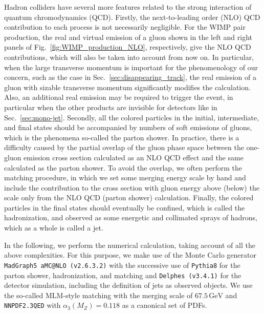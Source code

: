\documentclass[12pt,twoside,book]{article}
\begin{document}
Hadron colliders have several more features related to the strong interaction of quantum chromodynamics (QCD).
Firstly, the next-to-leading order (NLO) QCD contribution to each process is not necessarily negligible.
For the WIMP pair production, the real and virtual emission of a gluon shown in the left and right panels of Fig.~\ref{fig:WIMP_production_NLO}, respectively, give the NLO QCD contributions, which will also be taken into account from now on.
In particular, when the large transverse momentum is important for the phenomenology of our concern, such as the case in Sec.~\ref{sec:disappearing_track}, the real emission of a gluon with sizable transverse momentum significantly modifies the calculation.
Also, an additional real emission may be required to trigger the event, in particular when the other products are invisible for detectors like in Sec.~\ref{sec:mono-jet}.
Secondly, all the colored particles in the initial, intermediate, and final states should be accompanied by numbers of soft emissions of gluons, which is the phenomena so-called the parton shower.
In practice, there is a difficulty caused by the partial overlap of the gluon phase space between the one-gluon emission cross section calculated as an NLO QCD effect and the same calculated as the parton shower.
To avoid the overlap, we often perform the matching procedure, in which we set some merging energy scale by hand and include the contribution to the cross section with gluon energy above (below) the scale only from the NLO QCD (parton shower) calculation.
Finally, the colored particles in the final states should eventually be confined, which is called the hadronization, and observed as some energetic and collimated sprays of hadrons, which as a whole is called a jet.

In the following, we perform the numerical calculation, taking account of all the above complexities.
For this purpose, we make use of the Monte Carlo generator \texttt{MadGraph5 aMC@NLO (v2.6.3.2)} \cite{Alwall:2011uj,Alwall:2014hca} with the successive use of \texttt{Pythia8} \cite{Sjostrand:2014zea} for the parton shower, hadronization, and matching and \texttt{Delphes (v3.4.1)} \cite{deFavereau:2013fsa} for the detector simulation, including the definition of jets as observed objects.
We use the so-called MLM-style matching \cite{Mangano:2006rw} with the merging scale of $67.5\,\mathrm{GeV}$ and \texttt{NNPDF2.3QED} with $\alpha_3 (M_Z) = 0.118$ \cite{Ball:2013hta} as a canonical set of PDFs.
\end{document}
